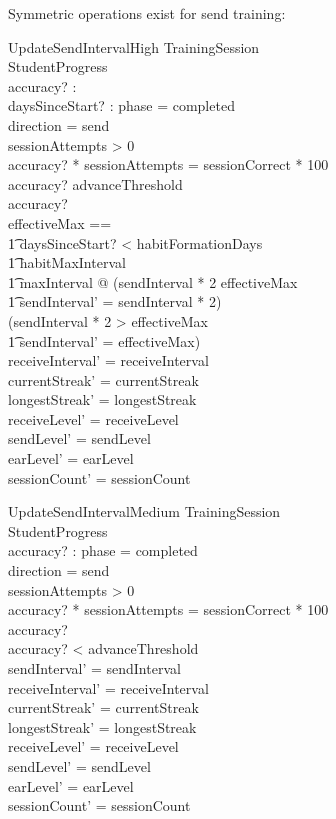 \documentclass[a4paper,10pt,fleqn]{article}
\begin{document}
Symmetric operations exist for send training:

\begin{schema}{UpdateSendIntervalHigh}
  \Xi TrainingSession \\
  \Delta StudentProgress \\
  accuracy? : \nat \\
  daysSinceStart? : \nat
  \where
  phase = completed \\
  direction = send \\
  sessionAttempts > 0 \\
  accuracy? * sessionAttempts = sessionCorrect * 100 \\
  accuracy? \geq advanceThreshold \\
  accuracy?  \\
  \LET effectiveMax == \\
  \t1 \IF daysSinceStart? < habitFormationDays \\
  \t1 \THEN habitMaxInterval \\
  \t1 \ELSE maxInterval @
  (sendInterval * 2 \leq effectiveMax \\
  \t1 \land sendInterval' = sendInterval * 2) \\
  \lor (sendInterval * 2 > effectiveMax \\
  \t1 \land sendInterval' = effectiveMax) \\
  receiveInterval' = receiveInterval \\
  currentStreak' = currentStreak \\
  longestStreak' = longestStreak \\
  receiveLevel' = receiveLevel \\
  sendLevel' = sendLevel \\
  earLevel' = earLevel \\
  sessionCount' = sessionCount
\end{schema}

\begin{schema}{UpdateSendIntervalMedium}
\Xi TrainingSession \\
\Delta StudentProgress \\
accuracy? : \nat
\where
phase = completed \\
direction = send \\
sessionAttempts > 0 \\
accuracy? * sessionAttempts = sessionCorrect * 100 \\
accuracy?  \\
accuracy? < advanceThreshold \\
sendInterval' = sendInterval \\
receiveInterval' = receiveInterval \\
currentStreak' = currentStreak \\
longestStreak' = longestStreak \\
receiveLevel' = receiveLevel \\
sendLevel' = sendLevel \\
earLevel' = earLevel \\
sessionCount' = sessionCount
\end{schema}
\end{document}
